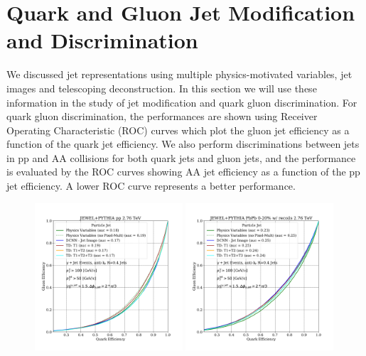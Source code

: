 \documentclass[notoc]{JHEP3}
\begin{document}
\section{Quark and Gluon Jet Modification and Discrimination}
\label{sec:results}

We discussed jet representations using multiple physics-motivated variables, jet images and telescoping deconstruction. In this section we will use these information in the study of jet modification and quark gluon discrimination. For quark gluon discrimination, the performances are shown using Receiver Operating Characteristic (ROC) curves which plot the gluon jet efficiency as a function of the quark jet efficiency. We also perform discriminations between jets in pp and AA collisions for both quark jets and gluon jets, and the performance is evaluated by the ROC curves showing AA jet efficiency as a function of the pp jet efficiency. A lower ROC curve represents a better performance.

\begin{figure}
	   \centering
	   \includegraphics[width=0.49\textwidth]{plots/JEWELPYTHIA_pp_2p76TeV_genLevel_QvsG.pdf}
	   \includegraphics[width=0.49\textwidth]{plots/JEWELPYTHIA_PbPb_2p76TeV_genLevel_QvsG.pdf}
	   \caption{}
\label{fig:ROC_all}
\end{figure}
\end{document}
